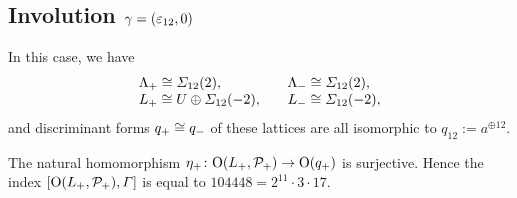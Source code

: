 \documentclass{amsart} %
\begin{document}
\subsection{Involution $\gamma=(\varepsilon_{12}, 0)$}\label{subsec:walls12}
%
%
In this case, we have
\[
\begin{array}{ll}
\Lambda_{+}\cong \varSigma_{12}(2), \quad   &\Lambda_{-}\cong \varSigma_{12}(2),\\
L_{+}\cong U\oplus \varSigma_{12}(-2), \quad &L_{-}\cong  \varSigma_{12}(-2), 
\end{array}
\]
and  discriminant forms $q_{+}\cong q_{-}$ of these lattices are all isomorphic to
$q_{12}:=a^{\oplus 12}$.
%
%
%
%  
%
%
\begin{proposition}
The   natural homomorphism 
${\eta}_{+}\colon \mathord{\mathrm{O}}(L_{+}, \mathord{\mathcal{P}}_{+})  \to  \mathord{\mathrm{O}}(q_{+})$ is surjective.
Hence the index 
$[\mathord{\mathrm{O}}(L_{+}, \mathord{\mathcal{P}}_{+}), \varGamma]$ is equal to 
$104448 ={2}^{11} \cdot {3} \cdot {17}$.
\end{proposition}
%
\end{document}
